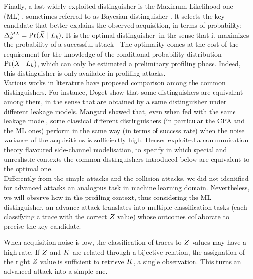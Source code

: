 Finally, a last widely exploited distinguisher is the Maximum-Likelihood one (ML) \cite{Chari2003}, sometimes referred to as Bayesian distinguisher \cite{mangard2011one}. It selects the key candidate that better explains the observed acquisition, in terms of probability: $\distinguisher^{ML}_{\keyVar} = \prob(\given{\vaLeakVec}{\leakageModel_\keyVar})$.  It is the optimal distinguisher, in the sense that it maximizes the probability of a successful attack \cite{heuser2014good}. The optimality comes at the cost of the requirement for the knowledge of the conditional probability distribution $\prob(\given{\vaLeakVec}{\leakageModel_\keyVar})$, which can only be estimated \via a preliminary profiling phase. Indeed, this distinguisher is only available in profiling attacks.\\

Various works in literature have proposed comparison among the common distinguishers. For instance, Doget \etal \cite{doget2011univariate} show that some distinguishers are equivalent among them, in the sense that are obtained by a same distinguisher under different leakage models. Mangard \etal \cite{mangard2011one} showed that, even when fed with the same leakage model, some classical different distinguishers (in particular the CPA and the ML ones) perform in the same way (in terms of success rate) when the noise variance of the acquisitions is sufficiently high. Heuser \etal \cite{heuser2014good} exploited a communication theory flavoured side-channel modelisation, to specify in which special and unrealistic contexts the common distinguishers introduced below are equivalent to the optimal one.\\

Differently from the simple attacks and the collision attacks, we did not identified for advanced attacks an analogous task in machine learning domain. Nevertheless, we will observe how in the profiling context, thus considering the ML distinguisher, an advance attack translates into multiple classification tasks (each classifying a trace with the correct $Z$ value) whose outcomes collaborate to precise the key candidate. 

\begin{remark}\label{rem:advanced_to_simple}
When acquisition noise is low, the classification of traces to $Z$ values may have a high rate. If $Z$ and $K$ are related through a bijective relation, the assignation of the right $Z$ value is sufficient to retrieve $K$, \via a single observation. This turns an advanced attack into a simple one.
\end{remark}


